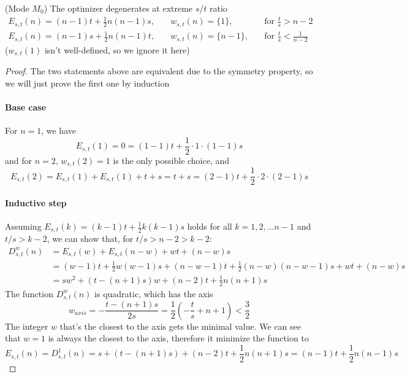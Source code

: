 \documentclass[]{article}
\begin{document}
\hspace{1cm}
\begin{lemma} (Mode $M_0$) The optimizer degenerates at extreme $s/t$ ratio
	\begin{align*}
	E_{s,t}(n) = (n-1)t + \frac{1}{2}n(n-1)s,\quad & w_{s,t}(n) = \{1\},\quad  &\text{for } \frac{t}{s} > n - 2 \\
	E_{s,t}(n) = (n-1)s + \frac{1}{2}n(n-1)t,\quad & w_{s,t}(n) = \{n-1\},\quad  &\text{for } \frac{t}{s} < \frac{1}{n-2}
	\end{align*}
	($w_{s,t}(1)$ isn't well-defined, so we ignore it here)
\end{lemma}
\begin{proof}
	The two statements above are equivalent due to the symmetry property, so we will just prove the first one by induction
	\paragraph{Base case} For $n=1$, we have
	\[
	E_{s,t}(1) = 0 = (1-1)t + \frac{1}{2}\cdot 1 \cdot (1-1) s
	\]
	and for $n=2$, $w_{s,t}(2) = 1$ is the only possible choice, and
	\[
	E_{s,t}(2) = E_{s,t}(1) + E_{s,t}(1) + t + s = t + s = (2-1)t + \frac{1}{2}\cdot 2 \cdot (2-1) s
	\]
	\paragraph{Inductive step} Assuming $E_{s,t}(k) = (k-1)t + \frac{1}{2}k(k-1)s$ holds for all $k = 1,2,\dots n-1$ and $t/s > k - 2$, we can show that, for $t/s > n - 2 > k - 2$:
	\begin{align*}
	D^w_{s,t}(n) &= E_{s,t}(w) + E_{s,t}(n-w)+wt+(n-w)s \\
	&=(w-1)t + \frac{1}{2}w(w-1)s + (n-w-1)t + \frac{1}{2}(n-w)(n-w-1)s+wt+(n-w)s\\
	&= sw^2 + (t-(n+1)s)w + (n-2)t + \frac{1}{2}n(n+1)s 
	\end{align*}
	The function $D^w_{s,t}(n)$ is quadratic, which has the axis 
	\[
		w_{axis} = -\frac{t-(n+1)s}{2s} = \frac{1}{2}\left(-\frac{t}{s} + n+1\right) < \frac{3}{2}
	\]
	The integer $w$ that's the closest to the axis gets the minimal value. We can see that $w=1$ is always the closest to the axis, therefore it minimize the function to
	\[
		E_{s,t}(n) = D^1_{s,t}(n) =s + (t-(n+1)s) + (n-2)t + \frac{1}{2}n(n+1)s = (n-1)t + \frac{1}{2}n(n-1)s
	\]
\end{proof}
\end{document}
